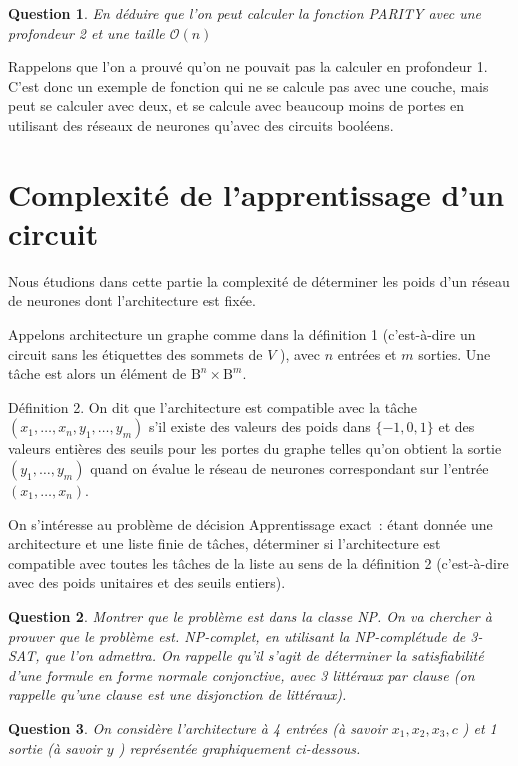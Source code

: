 \documentclass[10pt]{article}
\newtheorem{question}{Question}
\begin{document}
\begin{question}
	En déduire que l'on peut calculer la fonction PARITY avec une profondeur 2 et une taille $\mathcal{O}(n)$
\end{question}

Rappelons que l'on a prouvé qu'on ne pouvait pas la calculer en profondeur 1. C'est donc un exemple de fonction qui ne se calcule pas avec une couche, mais peut se calculer avec deux, et se calcule avec beaucoup moins de portes en utilisant des réseaux de neurones qu'avec des circuits booléens.

\section{Complexité de l'apprentissage d'un circuit}

Nous étudions dans cette partie la complexité de déterminer les poids d'un réseau de neurones dont l'architecture est fixée.

Appelons architecture un graphe comme dans la définition 1 (c'est-à-dire un circuit sans les étiquettes des sommets de $V$ ), avec $n$ entrées et $m$ sorties. Une tâche est alors un élément de $\mathrm{B}^{n} \times \mathrm{B}^{m}$.

Définition 2. On dit que l'architecture est compatible avec la tâche $\left(x_{1}, \ldots, x_{n}, y_{1}, \ldots, y_{m}\right)$ s'il existe des valeurs des poids dans $\{-1,0,1\}$ et des valeurs entières des seuils pour les portes du graphe telles qu'on obtient la sortie $\left(y_{1}, \ldots, y_{m}\right)$ quand on évalue le réseau de neurones correspondant sur l'entrée $\left(x_{1}, \ldots, x_{n}\right)$.

On s'intéresse au problème de décision Apprentissage exact : étant donnée une architecture et une liste finie de tâches, déterminer si l'architecture est compatible avec toutes les tâches de la liste au sens de la définition 2 (c'est-à-dire avec des poids unitaires et des seuils entiers).

\begin{question}
	Montrer que le problème est dans la classe NP. On va chercher à prouver que le problème est. NP-complet, en utilisant la NP-complétude de 3-SAT, que l'on admettra. On rappelle qu'il s'agit de déterminer la satisfiabilité d'une formule en forme normale conjonctive, avec 3 littéraux par clause (on rappelle qu'une clause est une disjonction de littéraux).
\end{question}

\begin{question}
	On considère l'architecture à 4 entrées (à savoir $x_{1}, x_{2}, x_{3}, c$ ) et 1 sortie (à savoir $y$ ) représentée graphiquement ci-dessous.
\end{question}
\end{document}
